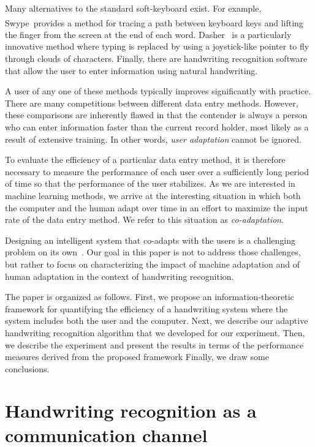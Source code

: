\documentclass{sigchi}
\begin{document}
\newcommand{\tm}{\textsuperscript{\textregistered}~}

Many alternatives to the standard soft-keyboard exist. For example,
Swype\tm provides a method for tracing a path between keyboard keys
and lifting the finger from the screen at the end of each
word. Dasher~\cite{Garrett2003} is a particularly innovative method
where typing is replaced by using a joystick-like pointer to fly
through clouds of characters. Finally, there are handwriting
recognition software that allow the user to enter information using
natural handwriting.

A user of any one of these methods typically improves significantly
with practice. There are many competitions between different data
entry methods. However, these comparisons are inherently flawed in
that the contender is always a person who can enter information faster
than the current record holder, most likely as a result of extensive
training. In other words, {\em user adaptation} cannot be ignored.

To evaluate the efficiency of a particular data entry method, it is
therefore necessary to measure the performance of each user over a
sufficiently long period of time so that the performance of the user
stabilizes. As we are interested in machine learning methods, we arrive
at the interesting situation in which both the computer and the human
adapt over time in an effort to maximize the input rate of the
data entry method. We refer to this situation as {\em co-adaptation}.

Designing an intelligent system that co-adapts with the users is a
challenging problem on its own~\cite{Hook2000, Maes1994, Lim2009a}.
Our goal in this paper is not to address those challenges, but rather
to focus on characterizing the impact of machine adaptation and of
human adaptation in the context of handwriting recognition.
 
The paper is organized as follows. First, we propose an
information-theoretic framework for quantifying the efficiency of a
handwriting system where the system includes both the user and the
computer. Next, we describe our adaptive handwriting recognition
algorithm that we developed for our experiment. Then, we describe the
experiment and present the results in terms of the performance
measures derived from the proposed framework Finally, we draw some
conclusions.


\section{Handwriting recognition as a communication channel}
\label{sec:channel}
\end{document}
